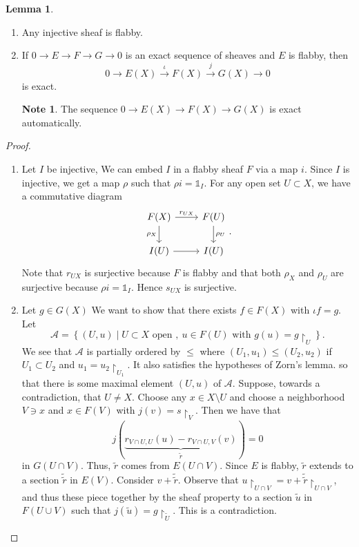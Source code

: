 \documentclass[10pt,letterpaper,cm]{nupset}
\theoremstyle{definition}
\newtheorem{note}[definition]{Note}
\theoremstyle{theorem}
\newtheorem{lemma}[definition]{Lemma}
\theoremstyle{remark}
\newcommand{\1}{\mathbb{1}}
\newcommand{\0}{\vec 0}
\begin{document}
\begin{lemma} $ $
\begin{enumerate}
\item Any injective sheaf is flabby. 
\item If $0 \to E \to F \to G \to 0$ is an exact sequence of sheaves and $E$ is flabby, then $$0 \to E(X) \overset{\iota}{\longrightarrow} F(X) \overset{j}{\longrightarrow} G(X) \to 0$$ is exact. 
\begin{note}
The sequence $0 \to E(X) \to F(X) \to G(X)$ is exact automatically.
\end{note}
\end{enumerate}
\end{lemma}
\begin{proof} $ $
\begin{enumerate}
\item Let $I$ be injective, We can embed $I$ in a flabby sheaf $F$ via a map $i$.  Since $I$ is injective, we get a map $\rho$ such that $\rho{i} = \1_I$.  For any open set $U \subset X$, we have a commutative diagram
\[
\begin{tikzcd}
F(X) \arrow[r, "r_{UX}"] \arrow[d, "\rho_X"'] & F(U) \arrow[d, "\rho_U"] \\
I(U) \arrow[r]                                & I(U)                    
\end{tikzcd}
. \]
Note that $r_{UX}$ is surjective because $F$ is flabby and that both $\rho_X$ and $\rho_U$ are surjective because $\rho{i} = \1_I$. Hence $s_{UX}$ is surjective. 
\item Let $g \in G(X)$ We want to show that there exists $f\in F(X)$ with $\iota{f} =g$. Let $$\mathcal{A} =  \left\{(U, u) \mid U \subset X\text{ open },\ u \in F(U)\text{ with }g(u) = g\restriction_U\right\}.$$ We see that $\mathcal{A}$ is partially ordered by $\leq$ where $(U_1, u_1) \leq (U_2, u_2)$ if $U_1 \subset U_2$ and $u_1 = u_2 \restriction_{U_1}$. It also satisfies the hypotheses of Zorn's lemma. so that there is some maximal element $(U,u)$ of $\mathcal{A}$. Suppose, towards a contradiction, that $U \ne X$. Choose any $x \in X \setminus U$ and choose a neighborhood $V \ni x$ and $x \in F(V)$ with $j(v) = s \restriction_V$. Then we have that $$  j(\underbrace{r_{V \cap U, U}(u) - r_{V \cap U, V}(v)}_{\tilde{r}}) =0  $$ in $G\left(U \cap V\right)$. Thus, $\tilde{r}$ comes from $E\left(U \cap V\right)$. Since $E$ is flabby, $\tilde{r}$ extends to a section $\tilde{\tilde{r}}$ in $E(V)$. Consider $v + \tilde{\tilde{r}}$. Observe that $u \restriction_{U \cap V} = v + \tilde{\tilde{r}}\restriction_{U \cap V}$, and thus these piece together by the sheaf property to a section $\tilde{u}$ in $F(U \cup V)$ such that $j(\tilde{u}) =g \restriction_{\tilde{U}}$. This is a contradiction. 
\end{enumerate}
\end{proof}
\end{document}
